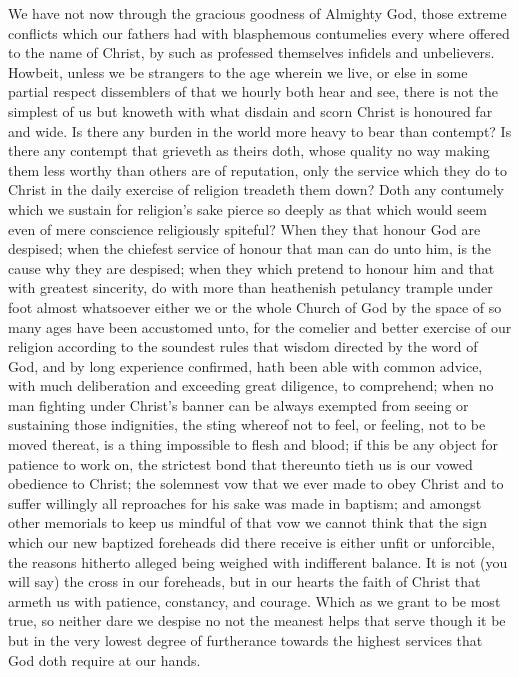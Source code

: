 We have not now through the gracious goodness of Almighty God, those extreme conflicts which our fathers had with blasphemous contumelies every where offered to the name of Christ, by such as professed themselves infidels and unbelievers. Howbeit, unless we be strangers to the age wherein we live, or else in some partial respect dissemblers  of that we hourly both hear and see, there is not the simplest of us but knoweth with what disdain and scorn Christ is honoured far and wide.
 Is there any burden in the world more heavy to bear than contempt? Is there any contempt that grieveth as theirs doth, whose quality no way making them less worthy than others are of reputation, only the service which they do to Christ in the daily exercise of religion treadeth them down? Doth any contumely which we sustain for religion’s sake pierce so deeply as that which would seem even of mere conscience religiously spiteful? When they that honour God are despised; when the chiefest service of honour that man can do unto him, is the cause why they are despised; when they which pretend to honour him and that with greatest sincerity, do with more than heathenish petulancy trample under foot almost whatsoever either we or the whole Church of God by the space of so many ages have been accustomed unto, for the comelier and better exercise of our religion according to the soundest rules that wisdom directed by the word of God, and by long experience confirmed, hath been able with common advice, with much deliberation and exceeding great diligence, to comprehend; when no man fighting under Christ’s banner can be always exempted from seeing or sustaining those indignities, the sting whereof not to feel, or feeling, not to be moved thereat, is a thing impossible to flesh and blood; if this be any object for patience to work on, the strictest bond that thereunto tieth us is our vowed obedience to Christ; the solemnest vow that we ever made to obey Christ and to suffer willingly all reproaches for his sake was made in baptism; and amongst other memorials to keep us mindful of that vow we cannot think that the sign which our new baptized foreheads did there receive is either unfit or unforcible, the reasons hitherto alleged being weighed with indifferent balance.
It is not (you will say) the cross in our foreheads, but in our hearts the faith of Christ that armeth us with patience, constancy, and courage. Which as we grant to be most true, so neither dare we despise no not the meanest helps that serve though it be but in the very lowest degree of furtherance towards the highest services that God doth require  at our hands.
